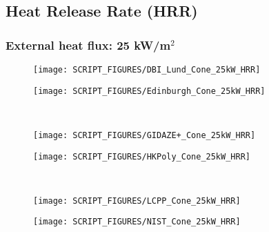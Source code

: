 \begin{landscape}
\subsection{Heat Release Rate (HRR)}
\label{Cone_HRR}
\subsubsection{External heat flux: 25 kW/m$^2$}
\begin{minipage}{0.65\textwidth}
\begin{figure}[H]
{\texttt{[image: SCRIPT\_FIGURES/DBI\_Lund\_Cone\_25kW\_HRR]}}\\
\end{figure}
\end{minipage}
\begin{minipage}{0.35\textwidth}
\begin{figure}[H]
{\texttt{[image: SCRIPT\_FIGURES/Edinburgh\_Cone\_25kW\_HRR]}}\\
\end{figure}
\end{minipage}\\
\vfill

\begin{minipage}{0.65\textwidth}
\begin{figure}[H]
{\texttt{[image: SCRIPT\_FIGURES/GIDAZE+\_Cone\_25kW\_HRR]}}\\
\end{figure}
\end{minipage}
\begin{minipage}{0.35\textwidth}
\begin{figure}[H]
{\texttt{[image: SCRIPT\_FIGURES/HKPoly\_Cone\_25kW\_HRR]}}\\
\end{figure}
\end{minipage}\\
\begin{minipage}{0.65\textwidth}
\begin{figure}[H]
{\texttt{[image: SCRIPT\_FIGURES/LCPP\_Cone\_25kW\_HRR]}}\\
\end{figure}
\end{minipage}
\begin{minipage}{0.35\textwidth}
\begin{figure}[H]
{\texttt{[image: SCRIPT\_FIGURES/NIST\_Cone\_25kW\_HRR]}}\\
\end{figure}
\end{minipage}
\vfill


\end{landscape}

